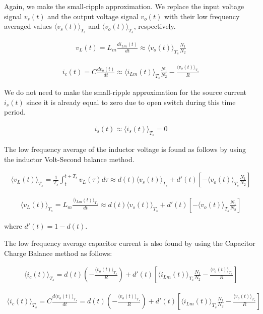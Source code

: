 Again, we make the small-ripple approximation. We replace the input voltage signal $v_s(t)$ and the output voltage signal $v_o(t)$ with their low frequency averaged values $\langle v_s(t) \rangle_{T_s}$ and $\langle v_o(t) \rangle_{T_s}$, respectively.

\begin{align}
    v_L(t) = L_m\frac{di_{Lm}(t)}{dt} \approx \langle v_o(t) \rangle_{T_s}\frac{N_1}{N_2}
\end{align}

\begin{align}
    i_c(t) = C\frac{dv_o(t)}{dt} \approx \langle i_{Lm}(t) \rangle_{T_s}\frac{N_1}{N_2} -\frac{\langle v_o(t) \rangle_{T_s}}{R}
\end{align}

We do not need to make the small-ripple approximation for the source current $i_s(t)$ since it is already equal to zero due to open switch during this time period.

\begin{align}
    i_s(t) \approx \langle i_s(t) \rangle_{T_s} = 0
\end{align}

The low frequency average of the inductor voltage is found as follows by using the inductor Volt-Second balance method.

\begin{align}
    \langle v_L(t) \rangle_{T_s} = \frac{1}{T_s}\int_{t}^{t+T_s} v_L(\tau)d\tau \approx d(t)\langle v_s(t) \rangle_{T_s} + d'(t)[-\langle v_o(t) \rangle_{T_s}\frac{N_1}{N_2}]
\end{align}

\begin{align}
    \langle v_L(t) \rangle_{T_s} = L_m\frac{\langle i_{Lm}(t) \rangle_{T_s}}{dt} \approx d(t)\langle v_s(t) \rangle_{T_s} + d'(t)[-\langle v_o(t) \rangle_{T_s}\frac{N_1}{N_2}]
    \label{eqn:ind}
\end{align}

where $d'(t) = 1 - d(t)$.

The low frequency average capacitor current is also found by using the Capacitor Charge Balance method as follows:

\begin{align}
    \langle i_c(t) \rangle_{T_s} = d(t)(-\frac{\langle v_o(t) \rangle_{T_s}}{R}) + d'(t)[\langle i_{Lm}(t) \rangle_{T_s}\frac{N_1}{N_2}-\frac{\langle v_o(t) \rangle_{T_s}}{R}]
\end{align}

\begin{align}
    \langle i_c(t) \rangle_{T_s} = C\frac{d\langle v_o(t) \rangle_{T_s}}{dt} = d(t)(-\frac{\langle v_o(t) \rangle_{T_s}}{R}) + d'(t)[\langle i_{Lm}(t) \rangle_{T_s}\frac{N_1}{N_2}-\frac{\langle v_o(t) \rangle_{T_s}}{R}]
\end{align}

